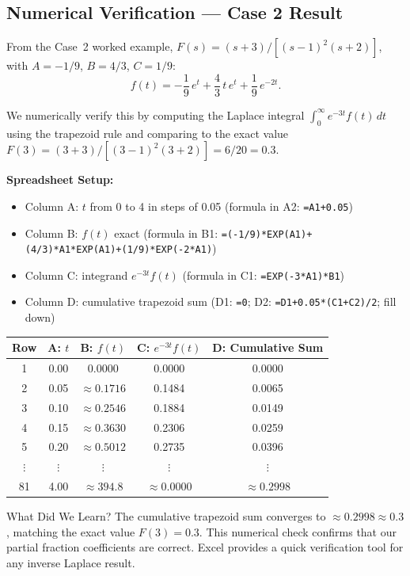\documentclass[12pt,a4paper]{article}
\begin{document}
\subsection{Numerical Verification --- Case 2 Result}

From the Case~2 worked example, $F(s) = (s+3)/[(s-1)^2(s+2)]$, with
$A=-1/9$, $B=4/3$, $C=1/9$:
\[
  f(t) = -\frac{1}{9}\,e^{t} + \frac{4}{3}\,t\,e^{t} + \frac{1}{9}\,e^{-2t}.
\]

We numerically verify this by computing the Laplace integral
$\int_0^\infty e^{-3t}f(t)\,dt$ using the trapezoid rule and comparing
to the exact value $F(3) = (3+3)/[(3-1)^2(3+2)] = 6/20 = 0.3$.

\medskip
\noindent\textbf{Spreadsheet Setup:}
\begin{itemize}[noitemsep]
  \item Column A: $t$ from 0 to 4 in steps of 0.05
    (formula in A2: \texttt{=A1+0.05})
  \item Column B: $f(t)$ exact
    (formula in B1: \texttt{=(-1/9)*EXP(A1)+(4/3)*A1*EXP(A1)+(1/9)*EXP(-2*A1)})
  \item Column C: integrand $e^{-3t}f(t)$
    (formula in C1: \texttt{=EXP(-3*A1)*B1})
  \item Column D: cumulative trapezoid sum
    (D1: \texttt{=0}; D2: \texttt{=D1+0.05*(C1+C2)/2}; fill down)
\end{itemize}

\begin{center}
\begin{tabular}{@{}ccccc@{}}
\toprule
\textbf{Row} & \textbf{A: $t$} & \textbf{B: $f(t)$} &
\textbf{C: $e^{-3t}f(t)$} & \textbf{D: Cumulative Sum} \\
\midrule
1 & 0.00 & 0.0000 & 0.0000 & 0.0000 \\
2 & 0.05 & $\approx 0.1716$ & 0.1484 & 0.0065 \\
3 & 0.10 & $\approx 0.2546$ & 0.1884 & 0.0149 \\
4 & 0.15 & $\approx 0.3630$ & 0.2306 & 0.0259 \\
5 & 0.20 & $\approx 0.5012$ & 0.2735 & 0.0396 \\
$\vdots$ & $\vdots$ & $\vdots$ & $\vdots$ & $\vdots$ \\
81 & 4.00 & $\approx 394.8$ & $\approx 0.0000$ & $\approx 0.2998$ \\
\bottomrule
\end{tabular}
\end{center}

\begin{learnbox}{What Did We Learn?}
The cumulative trapezoid sum converges to $\approx 0.2998 \approx 0.3$,
matching the exact value $F(3)=0.3$. This numerical check confirms that
our partial fraction coefficients are correct. Excel provides a quick
verification tool for any inverse Laplace result.
\end{learnbox}
\end{document}
